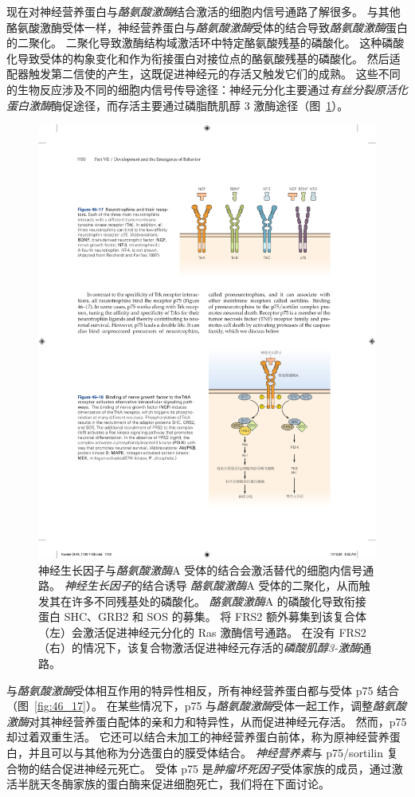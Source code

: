 现在对神经营养蛋白与\textit{酪氨酸激酶}结合激活的细胞内信号通路了解很多。
与其他酪氨酸激酶受体一样，神经营养蛋白与\textit{酪氨酸激酶}受体的结合导致\textit{酪氨酸激酶}蛋白的二聚化。
二聚化导致激酶结构域激活环中特定酪氨酸残基的磷酸化。
这种磷酸化导致受体的构象变化和作为衔接蛋白对接位点的酪氨酸残基的磷酸化。
然后适配器触发第二信使的产生，这既促进神经元的存活又触发它们的成熟。
这些不同的生物反应涉及不同的细胞内信号传导途径：神经元分化主要通过\textit{有丝分裂原活化蛋白激酶}酶促途径，而存活主要通过磷脂酰肌醇 3 激酶途径（图~\ref{fig:46_18}）。


\begin{figure}[htbp]
	\centering
	\includegraphics[width=0.67\linewidth]{chap46/fig_46_18}
	\caption{神经生长因子与\textit{酪氨酸激酶}A 受体的结合会激活替代的细胞内信号通路。
		\textit{神经生长因子}的结合诱导 \textit{酪氨酸激酶}A 受体的二聚化，从而触发其在许多不同残基处的磷酸化。
		\textit{酪氨酸激酶}A 的磷酸化导致衔接蛋白 SHC、GRB2 和 SOS 的募集。
		将 FRS2 额外募集到该复合体（左）会激活促进神经元分化的 Ras 激酶信号通路。
		在没有 FRS2（右）的情况下，该复合物激活促进神经元存活的\textit{磷酸肌醇3-激酶}通路。}
	\label{fig:46_18}
\end{figure}


与\textit{酪氨酸激酶}受体相互作用的特异性相反，所有神经营养蛋白都与受体 p75 结合（图~\ref{fig:46_17}）。
在某些情况下，p75 与\textit{酪氨酸激酶}受体一起工作，调整\textit{酪氨酸激酶}对其神经营养蛋白配体的亲和力和特异性，从而促进神经元存活。
然而，p75 却过着双重生活。
它还可以结合未加工的神经营养蛋白前体，称为原神经营养蛋白，并且可以与其他称为分选蛋白的膜受体结合。
\textit{神经营养素}与 p75/sortilin 复合物的结合促进神经元死亡。
受体 p75 是\textit{肿瘤坏死因子}受体家族的成员，通过激活半胱天冬酶家族的蛋白酶来促进细胞死亡，我们将在下面讨论。


